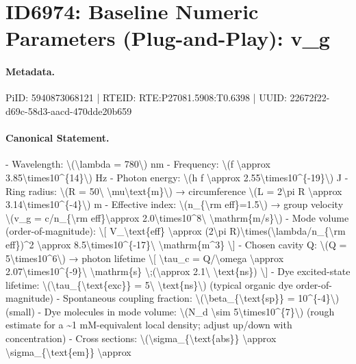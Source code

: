 \section*{ID6974: Baseline Numeric Parameters (Plug-and-Play): v\_g}
\paragraph{Metadata.}
PiID: 5940873068121 | RTEID: RTE:P27081.5908:T0.6398 | UUID: 22672f22-d69c-58d3-aacd-470dde20b659

\paragraph{Canonical Statement.}
- Wavelength: \textbackslash{}(\textbackslash{}lambda = 780\textbackslash{}) nm - Frequency: \textbackslash{}(f \textbackslash{}approx 3.85\textbackslash{}times10\textasciicircum{}\{14\}\textbackslash{}) Hz - Photon energy: \textbackslash{}(h f \textbackslash{}approx 2.55\textbackslash{}times10\textasciicircum{}\{-19\}\textbackslash{}) J - Ring radius: \textbackslash{}(R = 50\textbackslash{} \textbackslash{}mu\textbackslash{}text\{m\}\textbackslash{}) → circumference \textbackslash{}(L = 2\textbackslash{}pi R \textbackslash{}approx 3.14\textbackslash{}times10\textasciicircum{}\{-4\}\textbackslash{}) m - Effective index: \textbackslash{}(n\_\{\textbackslash{}rm eff\}=1.5\textbackslash{}) → group velocity \textbackslash{}(v\_g = c/n\_\{\textbackslash{}rm eff\}\textbackslash{}approx 2.0\textbackslash{}times10\textasciicircum{}8\textbackslash{} \textbackslash{}mathrm\{m/s\}\textbackslash{}) - Mode volume (order-of-magnitude): \textbackslash{}[ V\_\textbackslash{}text\{eff\} \textbackslash{}approx (2\textbackslash{}pi R)\textbackslash{}times(\textbackslash{}lambda/n\_\{\textbackslash{}rm eff\})\textasciicircum{}2 \textbackslash{}approx 8.5\textbackslash{}times10\textasciicircum{}\{-17\}\textbackslash{} \textbackslash{}mathrm\{m\textasciicircum{}3\} \textbackslash{}] - Chosen cavity Q: \textbackslash{}(Q = 5\textbackslash{}times10\textasciicircum{}6\textbackslash{}) → photon lifetime \textbackslash{}[ \textbackslash{}tau\_c = Q/\textbackslash{}omega \textbackslash{}approx 2.07\textbackslash{}times10\textasciicircum{}\{-9\}\textbackslash{} \textbackslash{}mathrm\{s\} \textbackslash{};(\textbackslash{}approx 2.1\textbackslash{} \textbackslash{}text\{ns\}) \textbackslash{}] - Dye excited-state lifetime: \textbackslash{}(\textbackslash{}tau\_\{\textbackslash{}text\{exc\}\} = 5\textbackslash{} \textbackslash{}text\{ns\}\textbackslash{}) (typical organic dye order-of-magnitude) - Spontaneous coupling fraction: \textbackslash{}(\textbackslash{}beta\_\{\textbackslash{}text\{sp\}\} = 10\textasciicircum{}\{-4\}\textbackslash{}) (small) - Dye molecules in mode volume: \textbackslash{}(N\_d \textbackslash{}sim 5\textbackslash{}times10\textasciicircum{}\{7\}\textbackslash{}) (rough estimate for a \textasciitilde{}1 mM-equivalent local density; adjust up/down with concentration) - Cross sections: \textbackslash{}(\textbackslash{}sigma\_\{\textbackslash{}text\{abs\}\} \textbackslash{}approx \textbackslash{}sigma\_\{\textbackslash{}text\{em\}\} \textbackslash{}approx 